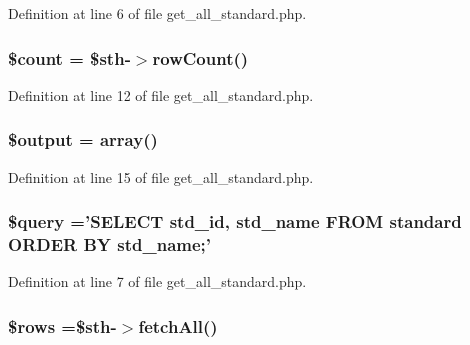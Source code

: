 Definition at line 6 of file get\-\_\-all\-\_\-standard.\-php.

\hypertarget{get__all__standard_8php_af789423037bbc89dc7c850e761177570}{
\subsubsection[{\$count}]{\setlength{\rightskip}{0pt plus 5cm}\$count = \$sth-\/$>$row\-Count()}}\label{get__all__standard_8php_af789423037bbc89dc7c850e761177570}


Definition at line 12 of file get\-\_\-all\-\_\-standard.\-php.

\hypertarget{get__all__standard_8php_a73004ce9cd673c1bfafd1dc351134797}{
\subsubsection[{\$output}]{\setlength{\rightskip}{0pt plus 5cm}\$output = array()}}\label{get__all__standard_8php_a73004ce9cd673c1bfafd1dc351134797}


Definition at line 15 of file get\-\_\-all\-\_\-standard.\-php.

\hypertarget{get__all__standard_8php_af59a5f7cd609e592c41dc3643efd3c98}{
\subsubsection[{\$query}]{\setlength{\rightskip}{0pt plus 5cm}\$query ='S\-E\-L\-E\-C\-T std\-\_\-id, std\-\_\-name F\-R\-O\-M standard O\-R\-D\-E\-R B\-Y std\-\_\-name;'}}\label{get__all__standard_8php_af59a5f7cd609e592c41dc3643efd3c98}


Definition at line 7 of file get\-\_\-all\-\_\-standard.\-php.

\hypertarget{get__all__standard_8php_ace2ec39e7df3899fa8df9640ec274b03}{
\subsubsection[{\$rows}]{\setlength{\rightskip}{0pt plus 5cm}\$rows =\$sth-\/$>$fetch\-All()}}\label{get__all__standard_8php_ace2ec39e7df3899fa8df9640ec274b03}


